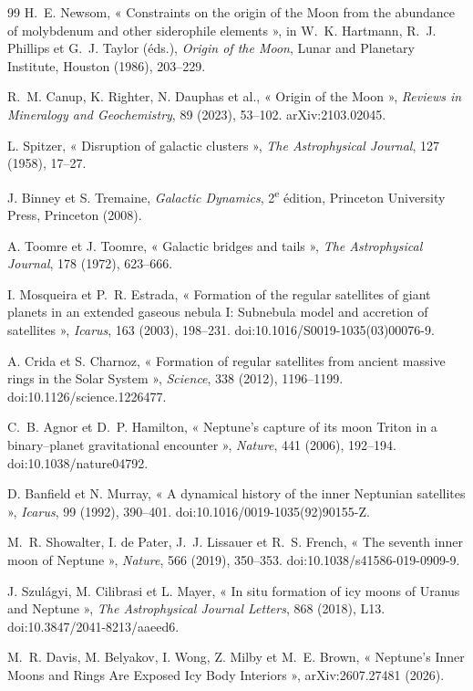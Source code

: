 \documentclass[11pt,a4paper,openany]{report}
\begin{document}
\begin{thebibliography}{99}
 H.~E. Newsom, « Constraints on the origin of the Moon from the abundance of
molybdenum and other siderophile elements », in W.~K. Hartmann, R.~J. Phillips et G.~J. Taylor
(éds.), \emph{Origin of the Moon}, Lunar and Planetary Institute, Houston (1986), 203--229.

 R.~M. Canup, K. Righter, N. Dauphas et al., « Origin of the Moon »,
\emph{Reviews in Mineralogy and Geochemistry}, 89 (2023), 53--102. arXiv:2103.02045.

 L. Spitzer, « Disruption of galactic clusters », \emph{The Astrophysical
Journal}, 127 (1958), 17--27.

 J. Binney et S. Tremaine, \emph{Galactic Dynamics}, 2\textsuperscript{e}
édition, Princeton University Press, Princeton (2008).

 A. Toomre et J. Toomre, « Galactic bridges and tails », \emph{The
Astrophysical Journal}, 178 (1972), 623--666.


 I. Mosqueira et P.~R. Estrada, « Formation of the regular
satellites of giant planets in an extended gaseous nebula I: Subnebula model and accretion of
satellites », \emph{Icarus}, 163 (2003), 198--231. doi:10.1016/S0019-1035(03)00076-9.

 A. Crida et S. Charnoz, « Formation of regular satellites from ancient
massive rings in the Solar System », \emph{Science}, 338 (2012), 1196--1199.
doi:10.1126/science.1226477.

 C.~B. Agnor et D.~P. Hamilton, « Neptune's capture of its moon Triton
in a binary--planet gravitational encounter », \emph{Nature}, 441 (2006), 192--194.
doi:10.1038/nature04792.

 D. Banfield et N. Murray, « A dynamical history of the inner
Neptunian satellites », \emph{Icarus}, 99 (1992), 390--401.
doi:10.1016/0019-1035(92)90155-Z.

 M.~R. Showalter, I. de Pater, J.~J. Lissauer et R.~S. French, « The
seventh inner moon of Neptune », \emph{Nature}, 566 (2019), 350--353.
doi:10.1038/s41586-019-0909-9.

 J. Szulágyi, M. Cilibrasi et L. Mayer, « In situ formation of icy moons of
Uranus and Neptune », \emph{The Astrophysical Journal Letters}, 868 (2018), L13.
doi:10.3847/2041-8213/aaeed6.

 M.~R. Davis, M. Belyakov, I. Wong, Z. Milby et M.~E. Brown, « Neptune's Inner
Moons and Rings Are Exposed Icy Body Interiors », arXiv:2607.27481 (2026).



\end{thebibliography}
\end{document}
